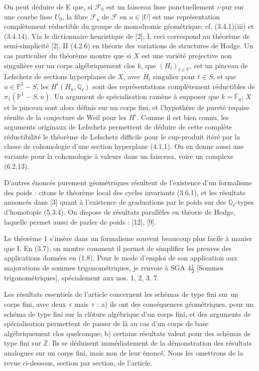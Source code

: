 \documentclass[11pt]{article}
\theoremstyle{remark}
\newcommand{\Ql}{\mathbb{Q}_\ell}
\newcommand{\Fbar}{\overline{\mathbb{F}}_q}
\begin{document}
On peut déduire de E que, si $\mathcal F_0$ est un faisceau lisse ponctuellement $\iota$-pur sur une courbe lisse $U_0$, la fibre $\mathcal F_u$ de $\mathcal F$ en $u\in |U|$ est une représentation complètement réductible du groupe de monodromie géométrique; cf. (3.4.1)(iii) et (3.4.14). Via le dictionnaire heuristique de [2], I, ceci correspond au théorème de semi-simplicité [2], II (4.2.6) en théorie des variations de structures de Hodge. Un cas particulier du théorème montre que si $X$ est une variété projective non singulière sur un corps algébriquement clos $k$, que $(H_t)_{t\in\mathbb P^1}$ est un pinceau de Lefschetz de sections hyperplanes de $X$, avec $H_t$ singulier pour $t\in S$, et que $u\in\mathbb P^1-S$, les $H^i(H_u,\Ql)$ sont des représentations complètement réductibles de $\pi_1(\mathbb P^1-S,u)$. Un argument de spécialisation ramène à supposer que $k=\Fbar$; $X$ et le pinceau sont alors définis sur un corps fini, et l'hypothèse de pureté requise résulte de la conjecture de Weil pour les $H^i$. Comme il est bien connu, les arguments originaux de Lefschetz permettent de déduire de cette complète réductibilité le théorème de Lefschetz difficile pour le cup-produit itéré par la classe de cohomologie d'une section hyperplane (4.1.1). On en donne aussi une variante pour la cohomologie à valeurs dans un faisceau, voire un complexe (6.2.13).

D'autres énoncés purement géométriques résultent de l'existence d'un formalisme des poids : citons le théorème local des cycles invariants (3.6.1), et les résultats annoncés dans [3] quant à l'existence de graduations par le poids sur des $\Ql$-types d'homotopie (5.3.4). On dispose de résultats parallèles en théorie de Hodge, laquelle permet aussi de parler de poids : [12], [9].

Le théorème 1 s'insère dans un formalisme souvent beaucoup plus facile à manier que I. En (3.7), on montre comment il permet de simplifier les preuves des applications données en (1.8). Pour le mode d'emploi de son application aux majorations de sommes trigonométriques, je renvoie à SGA $4\frac12$ [Sommes trigonométriques], spécialement aux nos. 1, 2, 3, 7.

Les résultats essentiels de l'article concernent les schémas de type fini sur un corps fini, avec deux « mais » : a) ils ont des conséquences géométriques, pour un schéma de type fini sur la clôture algébrique d'un corps fini, et des arguments de spécialisation permettent de passer de là au cas d'un corps de base algébriquement clos quelconque; b) certains résultats valent pour des schémas de type fini sur $\mathbb Z$. Ils se déduisent immédiatement de la démonstration des résultats analogues sur un corps fini, mais non de leur énoncé. Nous les omettrons de la revue ci-dessous, section par section, de l'article.
\end{document}
